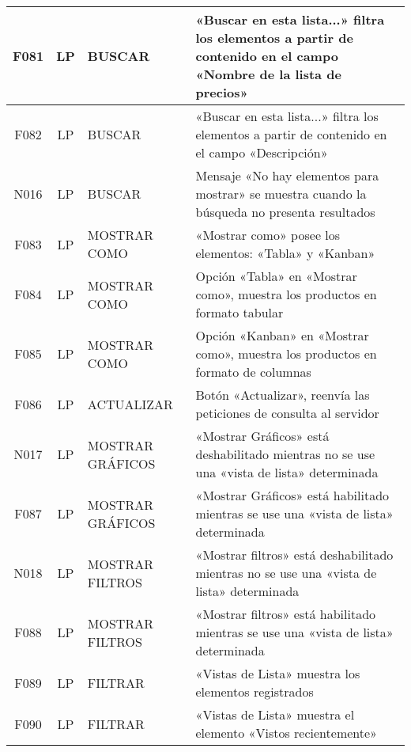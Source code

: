 \begin{landscape}
{\begin{longtable}[htb]{|c|c|p{3.8cm}|p{15.2cm}|}
\scriptsize{F081} & \scriptsize{LP} & \scriptsize{BUSCAR} & \scriptsize{«Buscar en esta lista...» filtra los elementos a partir de contenido en el campo «Nombre de la lista de precios»} \\ \hline
\scriptsize{F082} & \scriptsize{LP} & \scriptsize{BUSCAR} & \scriptsize{«Buscar en esta lista...» filtra los elementos a partir de contenido en el campo «Descripción»} \\ \hline
\scriptsize{N016} & \scriptsize{LP} & \scriptsize{BUSCAR} & \scriptsize{Mensaje «No hay elementos para mostrar» se muestra cuando la búsqueda no presenta resultados} \\ \hline
\scriptsize{F083} & \scriptsize{LP} & \scriptsize{MOSTRAR COMO} & \scriptsize{«Mostrar como» posee los elementos: «Tabla» y «Kanban»} \\ \hline
\scriptsize{F084} & \scriptsize{LP} & \scriptsize{MOSTRAR COMO} & \scriptsize{Opción «Tabla» en «Mostrar como», muestra los productos en formato tabular} \\ \hline
\scriptsize{F085} & \scriptsize{LP} & \scriptsize{MOSTRAR COMO} & \scriptsize{Opción «Kanban» en «Mostrar como», muestra los productos en formato de columnas} \\ \hline
\scriptsize{F086} & \scriptsize{LP} & \scriptsize{ACTUALIZAR} & \scriptsize{Botón «Actualizar», reenvía las peticiones de consulta al servidor} \\ \hline
\scriptsize{N017} & \scriptsize{LP} & \scriptsize{MOSTRAR GRÁFICOS} & \scriptsize{«Mostrar Gráficos» está deshabilitado mientras no se use una «vista de lista» determinada} \\ \hline
\scriptsize{F087} & \scriptsize{LP} & \scriptsize{MOSTRAR GRÁFICOS} & \scriptsize{«Mostrar Gráficos» está habilitado mientras se use una «vista de lista» determinada} \\ \hline
\scriptsize{N018} & \scriptsize{LP} & \scriptsize{MOSTRAR FILTROS} & \scriptsize{«Mostrar filtros» está deshabilitado mientras no se use una «vista de lista» determinada} \\ \hline
\scriptsize{F088} & \scriptsize{LP} & \scriptsize{MOSTRAR FILTROS} & \scriptsize{«Mostrar filtros» está habilitado mientras se use una «vista de lista» determinada} \\ \hline
\scriptsize{F089} & \scriptsize{LP} & \scriptsize{FILTRAR} & \scriptsize{«Vistas de Lista» muestra los elementos registrados} \\ \hline
\scriptsize{F090} & \scriptsize{LP} & \scriptsize{FILTRAR} & \scriptsize{«Vistas de Lista» muestra el elemento «Vistos recientemente»} \\ \hline

\end{longtable}}
\end{landscape}
